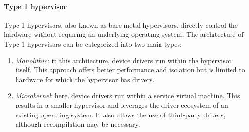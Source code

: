 \paragraph*{Type 1 hypervisor}
Type 1 hypervisors, also known as bare-metal hypervisors, directly control the hardware without requiring an underlying operating system. 
The architecture of Type 1 hypervisors can be categorized into two main types:
\begin{enumerate}
    \item \textit{Monolithic}: in this architecture, device drivers run within the hypervisor itself. 
        This approach offers better performance and isolation but is limited to hardware for which the hypervisor has drivers.
    \item \textit{Microkernel}: here, device drivers run within a service virtual machine. 
        This results in a smaller hypervisor and leverages the driver ecosystem of an existing operating system. 
        It also allows the use of third-party drivers, although recompilation may be necessary.
\end{enumerate}
